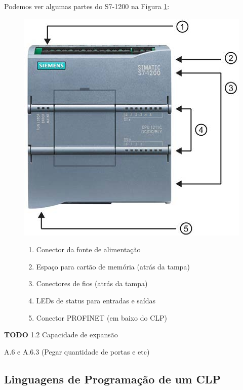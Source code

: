 \documentclass[a4paper, 12pt]{article}
\begin{document}
			Podemos ver algumas partes do S7-1200 na Figura \ref{fig:s7-1200-parts}:
			
			\begin{figure}[H]
				\centering
				\begin{minipage}{.5\textwidth}
			  		\centering
			  		\includegraphics[width=.65\linewidth]{figures/s7-1200_parts.png}
				  \label{fig:s7-1200-parts}
				\end{minipage}%
				\begin{minipage}{.5\textwidth}
			  		\centering
			  		\begin{enumerate}
			  			\item Conector da fonte de alimentação
			  			\item Espaço para cartão de memória (atrás da tampa)
			  			\item Conectores de fios (atrás da tampa)
			  			\item LEDs de status para entradas e saídas
			  			\item Conector PROFINET (em baixo do CLP)
			  		\end{enumerate}
				\end{minipage}
			\end{figure}
		
			\textbf{TODO}
			1.2 Capacidade de expansão
		
			A.6 e A.6.3 (Pegar quantidade de portas e etc)

	\subsection{Linguagens de Programação de um CLP}
	
\end{document}
